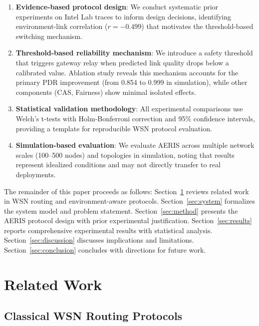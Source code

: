 \documentclass[sensors,article,submit,moreauthors,pdftex]{Definitions/mdpi}
\begin{document}
\begin{enumerate}
\item \textbf{Evidence-based protocol design}: We conduct systematic prior experiments on Intel Lab traces to inform design decisions, identifying environment-link correlation ($r=-0.499$) that motivates the threshold-based switching mechanism.

\item \textbf{Threshold-based reliability mechanism}: We introduce a safety threshold that triggers gateway relay when predicted link quality drops below a calibrated value. Ablation study reveals this mechanism accounts for the primary PDR improvement (from 0.854 to 0.999 in simulation), while other components (CAS, Fairness) show minimal isolated effects.

\item \textbf{Statistical validation methodology}: All experimental comparisons use Welch's t-tests with Holm-Bonferroni correction and 95\% confidence intervals, providing a template for reproducible WSN protocol evaluation.

\item \textbf{Simulation-based evaluation}: We evaluate AERIS across multiple network scales (100--500 nodes) and topologies in simulation, noting that results represent idealized conditions and may not directly transfer to real deployments.
\end{enumerate}

The remainder of this paper proceeds as follows: Section~\ref{sec:related} reviews related work in WSN routing and environment-aware protocols. Section~\ref{sec:system} formalizes the system model and problem statement. Section~\ref{sec:method} presents the AERIS protocol design with prior experimental justification. Section~\ref{sec:results} reports comprehensive experimental results with statistical analysis. Section~\ref{sec:discussion} discusses implications and limitations. Section~\ref{sec:conclusion} concludes with directions for future work.

\section{Related Work}\label{sec:related}

\subsection{Classical WSN Routing Protocols}
\end{document}
